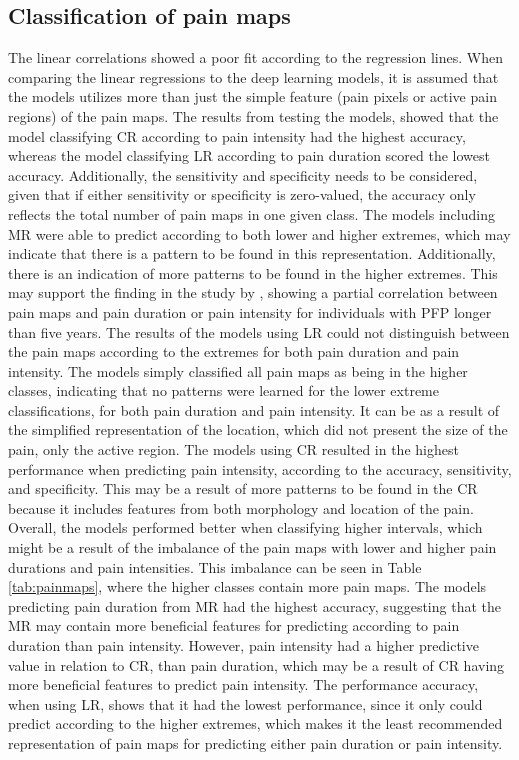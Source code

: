 \subsection{Classification of pain maps}
The linear correlations showed a poor fit according to the regression lines. When comparing the linear regressions to the deep learning models, it is assumed that the models utilizes more than just the simple feature (pain pixels or active pain regions) of the pain maps. 
The results from testing the models, showed that the model classifying CR according to pain intensity had the highest accuracy, whereas the model classifying LR according to pain duration scored the lowest accuracy. Additionally, the sensitivity and specificity needs to be considered, given that if either sensitivity or specificity is zero-valued, the accuracy only reflects the total number of pain maps in one given class.\newline
\noindent
The models including MR were able to predict according to both lower and higher extremes, which may indicate that there is a pattern to be found in this representation. Additionally, there is an indication of more patterns to be found in the higher extremes. This may support  the finding in the study by \citeauthor{Boudreau2017} \citep{Boudreau2017}, showing a partial correlation between pain maps and pain duration or pain intensity for individuals with PFP longer than five years.
The results of the models using LR could not distinguish between the pain maps according to the extremes for both pain duration and pain intensity. The models simply classified all pain maps as being in the higher classes, indicating that no patterns were learned for the lower extreme classifications, for both pain duration and pain intensity. It can be as a result of the simplified representation of the location, which did not present the size of the pain, only the active region.
The models using CR resulted in the highest performance when predicting pain intensity, according to the accuracy, sensitivity, and specificity. This may be a result of more patterns to be found in the CR because it includes features from both morphology and location of the pain. 
Overall, the models performed better when classifying higher intervals, which might be a result of the imbalance of the pain maps with lower and higher pain durations and pain intensities. This imbalance can be seen in Table \ref{tab:painmaps}, where the higher classes contain more pain maps.
The models predicting pain duration from MR had the highest accuracy, suggesting that the MR may contain more beneficial features for predicting according to pain duration than pain intensity. However, pain intensity had a higher predictive value in relation to CR, than pain duration, which may be a result of CR having more beneficial features to predict pain intensity. 
The performance accuracy, when using LR, shows that it had the lowest performance, since it only could predict according to the higher extremes, which makes it the least recommended representation of pain maps for predicting either pain duration or pain intensity.   


